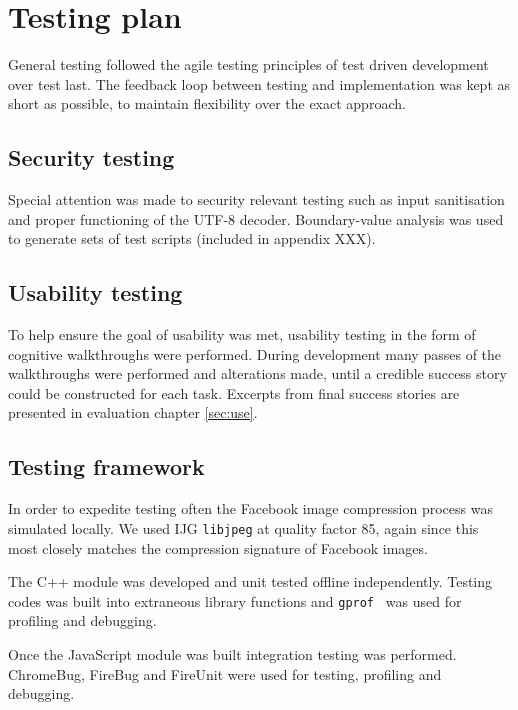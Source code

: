\FloatBarrier
\section{Testing plan}

General testing followed the agile testing principles of test driven development over test last. The feedback loop between testing and implementation was kept as short as possible, to maintain flexibility over the exact approach.


\subsection{Security testing}

Special attention was made to security relevant testing such as input sanitisation and proper functioning of the UTF-8 decoder. Boundary-value analysis was used to generate sets of test scripts (included in appendix XXX).


\subsection{Usability testing}

To help ensure the goal of usability was met, usability testing in the form of cognitive walkthroughs were performed. During development many passes of the walkthroughs were performed and alterations made, until a credible success story could be constructed for each task. Excerpts from final success stories are presented in evaluation chapter \ref{sec:use}.


\subsection{Testing framework}

In order to expedite testing often the Facebook image compression process was simulated locally. We used IJG {\tt libjpeg} at quality factor 85, again since this most closely matches the compression signature of Facebook images.

The C++ module was developed and unit tested offline independently. Testing codes was built into extraneous library functions and {\tt gprof } was used for profiling and debugging.

Once the JavaScript module was built integration testing was performed. ChromeBug, FireBug and FireUnit were used for testing, profiling and debugging.

